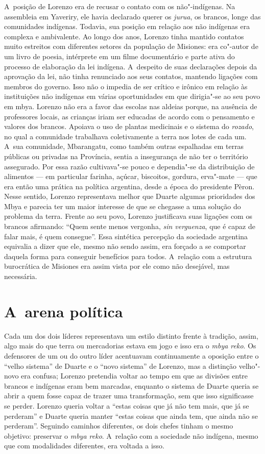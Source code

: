 A~posição de Lorenzo era de recusar o contato com os não"-indígenas. Na
assembleia em Yaveriry, ele havia declarado querer os \emph{jurua}, os
brancos, longe das comunidades indígenas. Todavia, sua posição em
relação aos não indígenas era complexa e ambivalente. Ao longo dos
anos, Lorenzo tinha mantido contatos muito estreitos com diferentes
setores da população de Misiones: era co"-autor de um livro de poesia,
intérprete em um filme documentário e parte ativa do processo de
elaboração da lei indígena. A~despeito de suas declarações depois da
aprovação da lei, não tinha renunciado aos seus contatos, mantendo
ligações com membros do governo. Isso não o impedia de ser crítico e
irônico em relação às instituições não indígenas em várias
oportunidades em que dirigia"-se ao seu povo em mbya. Lorenzo não era a
favor das escolas nas aldeias porque, na ausência de professores
locais, as crianças iriam ser educadas de acordo com o pensamento e
valores dos brancos. Apoiava o uso de plantas medicinais e o sistema do
\emph{rozado}, no qual a comunidade trabalhava coletivamente a terra nos lotes
de cada um. A~sua comunidade, Mbarangatu, como também outras espalhadas
em terras públicas ou privadas na Província, sentia a insegurança de
não ter o território assegurado. Por essa razão cultivava"-se pouco e
dependia"-se da distribuição de alimentos --- em particular farinha,
açúcar, biscoitos, gordura, erva"-mate --- que era então uma prática na
política argentina, desde a época do presidente Pèron. Nesse sentido,
Lorenzo representava melhor que Duarte algumas prioridades dos Mbya e
parecia ter um maior interesse de que se chegasse a uma solução do
problema da terra. Frente ao seu povo, Lorenzo justificava suas
ligações com os brancos afirmando: ``Quem sente menos vergonha, \emph{sin
verguenza}, que é capaz de falar mais, é quem consegue''. Essa sintética
percepção da sociedade argentina equivalia a dizer que ele, mesmo não
sendo assim, era forçado a se comportar daquela forma para conseguir
benefícios para todos. A~relação com a estrutura burocrática de
Misiones era assim vista por ele como não desejável, mas necessária.

\section{A~arena política} 

Cada um dos dois líderes representava um estilo distinto frente à
tradição, assim, algo mais do que terra ou mercadorias estava em jogo e
isso era o \emph{mbya reko}. Os defensores de um ou do outro líder acentuavam
continuamente a oposição entre o ``velho sistema'' de Duarte e o ``novo
sistema'' de Lorenzo, mas a distinção velho"-novo era confusa; Lorenzo
pretendia voltar ao tempo em que as divisões entre brancos e indígenas
eram bem marcadas, enquanto o sistema de Duarte queria se abrir a quem
fosse capaz de trazer uma transformação, sem que isso significasse se
perder. Lorenzo queria voltar a ``estas coisas que já não tem mais, que
já se perderam'' e Duarte queria manter ``estas coisas que ainda tem, que
ainda não se perderam''. Seguindo caminhos diferentes, os dois chefes
tinham o mesmo objetivo: preservar o \emph{mbya reko}. A~relação com a
sociedade não indígena, mesmo que com modalidades diferentes, era
voltada a isso.


